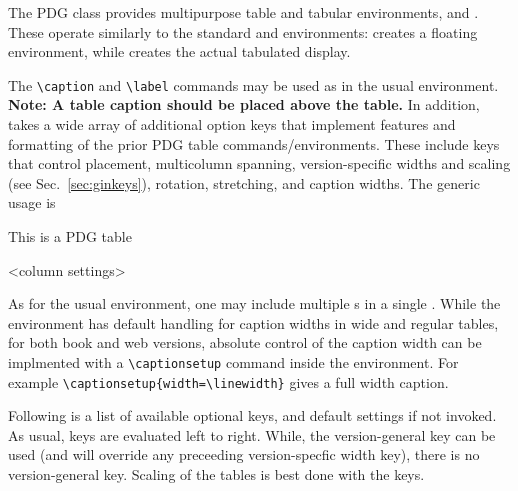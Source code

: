 \label{sec:tables}
The PDG class provides multipurpose table and tabular environments,  and . 
These operate similarly to the standard  and  environments:  creates a floating environment, 
while  creates the actual tabulated display. 

The \lstinline!\caption! and \lstinline!\label! commands may be used as in the usual  environment.
\textbf{Note: A table caption should be placed above the table.}
In addition,  takes a wide array of additional option keys that implement features and formatting of the prior PDG table commands/environments.  
These include keys that control placement, multicolumn spanning, version-specific widths and scaling (see Sec.~\ref{sec:ginkeys}), rotation, stretching, and caption widths.
The generic usage is
\begin{verbtex}
\begin{pdgxtable}
	\caption{This is a PDG table}
	\label{tab:label}
	\begin{pdgxtabular}{<column settings>} %
	\end{pdgxtabular}
\end{pdgxtable}
\end{verbtex}

As for the usual  environment, one may include multiple s in a single .
While the  environment has default handling for caption widths in wide and regular tables, for both book and web versions, 
absolute control of the caption width can be implmented with a \lstinline{\captionsetup} command inside the  environment. 
For example \lstinline!\captionsetup{width=\linewidth}! gives a full width caption.

Following is a list of available optional keys, and default settings if not invoked.
As usual, keys are evaluated left to right. 
While, the version-general  key can be used (and will override any preceeding version-specfic width key), 
there is no version-general  key. 
Scaling of the tables is best done with the  keys.

